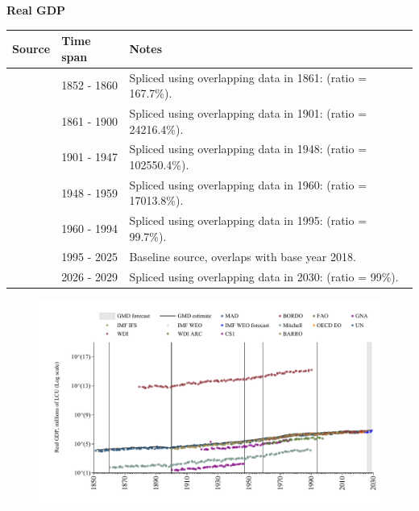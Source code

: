 \documentclass[12pt,a4paper,landscape]{article}
\begin{document}
\begin{adjustbox}{max totalsize={\paperwidth}{\paperheight},center}
\begin{minipage}[t][\textheight][t]{\textwidth}
\vspace*{0.5cm}
{}
\begin{center}
{\Large\bfseries Real GDP}
\end{center}
\vspace{0.5cm}
\begin{table}[H]
\centering
\small
\begin{tabular}{|l|l|l|}
\hline
\textbf{Source} & \textbf{Time span} & \textbf{Notes} \\
\hline
\rowcolor{white}\cite{MAD}& 1852 - 1860 &Spliced using overlapping data in 1861: (ratio = 167.7\%). \\
\rowcolor{lightgray}\cite{Mitchell}& 1861 - 1900 &Spliced using overlapping data in 1901: (ratio = 24216.4\%). \\
\rowcolor{white}\cite{CS1_BRA}& 1901 - 1947 &Spliced using overlapping data in 1948: (ratio = 102550.4\%). \\
\rowcolor{lightgray}\cite{Mitchell}& 1948 - 1959 &Spliced using overlapping data in 1960: (ratio = 17013.8\%). \\
\rowcolor{white}\cite{WDI}& 1960 - 1994 &Spliced using overlapping data in 1995: (ratio = 99.7\%). \\
\rowcolor{lightgray}\cite{OECD_EO}& 1995 - 2025 &Baseline source, overlaps with base year 2018. \\
\rowcolor{white}\cite{IMF_WEO_forecast}& 2026 - 2029 &Spliced using overlapping data in 2030: (ratio = 99\%). \\
\hline
\end{tabular}
\end{table}
\begin{figure}[H]
\centering
\includegraphics[width=\textwidth,height=0.6\textheight,keepaspectratio]{graphs/BRA_rGDP.pdf}
\end{figure}
\end{minipage}
\end{adjustbox}
\end{document}
